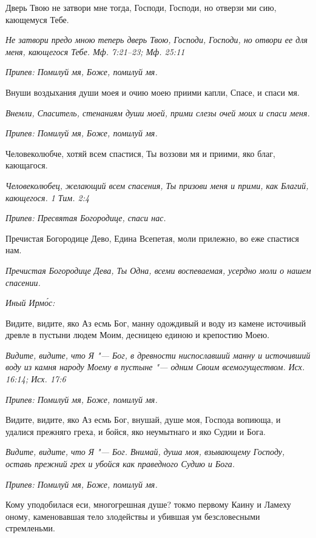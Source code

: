 Дверь Твою не затвори мне тогда, Господи, Господи, но отверзи ми сию, кающемуся Тебе.


\itshape Не затвори предо мною теперь дверь Твою, Господи, Господи, но отвори ее для меня, кающегося Тебе. Мф. 7:21–23; Мф. 25:11\normalfont{}


\itshape Припев:\normalfont{} Помилуй мя, Боже, помилуй мя.


Внуши воздыхания души моея и очию моею приими капли, Спасе, и спаси мя.


\itshape Внемли, Спаситель, стенаниям души моей, прими слезы очей моих и спаси меня.\normalfont{}


\itshape Припев:\normalfont{} Помилуй мя, Боже, помилуй мя.


Человеколюбче, хотяй всем спастися, Ты воззови мя и приими, яко благ, кающагося.


\itshape Человеколюбец, желающий всем спасения, Ты призови меня и прими, как Благий, кающегося. 1 Тим. 2:4\normalfont{}


\itshape Припев:\normalfont{} Пресвятая Богородице, спаси нас.


Пречистая Богородице Дево, Едина Всепетая, моли прилежно, во еже спастися нам.


\itshape Пречистая Богородице Дева, Ты Одна, всеми воспеваемая, усердно моли о нашем спасении.\normalfont{}


\itshape Иный Ирмо́с:\normalfont{}


Видите, видите, яко Аз есмь Бог, манну одождивый и воду из камене источивый древле в пустыни людем Моим, десницею единою и крепостию Моею.


\itshape Видите, видите, что Я "--- Бог, в древности ниспославший манну и источивший воду из камня народу Моему в пустыне "--- одним Своим всемогуществом. Исх. 16:14; Исх. 17:6\normalfont{}


\itshape Припев:\normalfont{} Помилуй мя, Боже, помилуй мя.


Видите, видите, яко Аз есмь Бог, внушай, душе моя, Господа вопиюща, и удалися прежняго греха, и бойся, яко неумытнаго и яко Судии и Бога.


\itshape Видите, видите, что Я "--- Бог. Внимай, душа моя, взывающему Господу, оставь прежний грех и убойся как праведного Судию и Бога.\normalfont{}


\itshape Припев:\normalfont{} Помилуй мя, Боже, помилуй мя.


Кому уподобилася еси, многогрешная душе? токмо первому Каину и Ламеху оному, каменовавшая тело злодействы и убившая ум безсловесными стремленьми.



